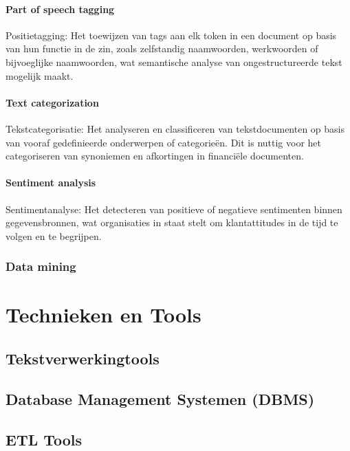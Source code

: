 \paragraph{Part of speech tagging}
Positietagging: Het toewijzen van tags aan elk token in een document op basis van hun functie in de zin, zoals zelfstandig naamwoorden, werkwoorden of bijvoeglijke naamwoorden, wat semantische analyse van ongestructureerde tekst mogelijk maakt.

\paragraph{Text categorization}
Tekstcategorisatie: Het analyseren en classificeren van tekstdocumenten op basis van vooraf gedefinieerde onderwerpen of categorieën. Dit is nuttig voor het categoriseren van synoniemen en afkortingen in financiële documenten.

\paragraph{Sentiment analysis}
Sentimentanalyse: Het detecteren van positieve of negatieve sentimenten binnen gegevensbronnen, wat organisaties in staat stelt om klantattitudes in de tijd te volgen en te begrijpen.

\subsubsection{Data mining}
















\section{Technieken en Tools}
\subsection{Tekstverwerkingtools}
\subsection{Database Management Systemen (DBMS)}
\subsection{ETL Tools}



